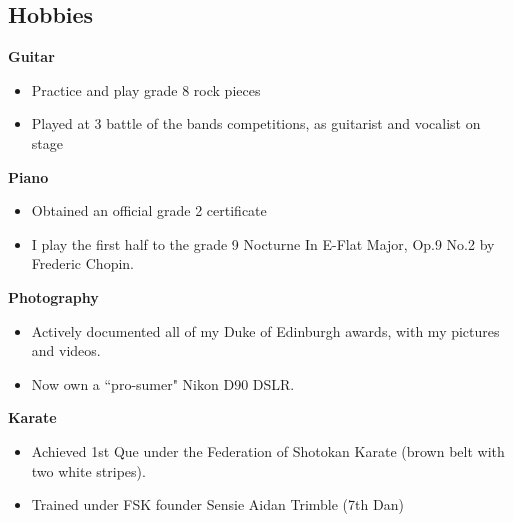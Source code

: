 \documentclass[margin,line]{resume}
\begin{document}
\begin{resume}
    \section{\mysidestyle Hobbies}

    \textbf{Guitar}\vspace{-2mm}\\%
    \begin{itemize}
		\item Practice and play grade 8 rock pieces
		\item Played at 3 battle of the bands competitions, as guitarist and vocalist on stage
    \end{itemize}
    
    \textbf{Piano}\vspace{-2mm}\\%
    \begin{itemize}
		\item Obtained an official grade 2 certificate
		\item I play the first half to the grade 9 Nocturne In E-Flat Major, Op.9 No.2 by Frederic Chopin.
    \end{itemize}
    
    \textbf{Photography}\vspace{-2mm}\\%
    \begin{itemize}
    		\item Actively documented all of my Duke of Edinburgh awards, with my pictures and videos.
		\item Now own a ``pro-sumer" Nikon D90 DSLR.
    \end{itemize}
    
    \textbf{Karate}\vspace{-2mm}\\%
    \begin{itemize}
    		\item Achieved 1st Que under the Federation of Shotokan Karate (brown belt with two white stripes).
		\item Trained under FSK founder Sensie Aidan Trimble (7th Dan)
    \end{itemize}
    






\end{resume}
\end{document}
